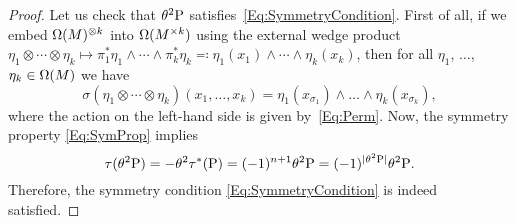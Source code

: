 \documentclass[\MainFolder/Text.tex]{subfiles}
\begin{document}
\begin{proof}
Let us check that $\theta^{2}\mathrm{P}$ satisfies~\eqref{Eq:SymmetryCondition}. First of all, if we embed $\Omega(M)^{\otimes k}$ into $\Omega(M^{\times k})$ using the external wedge product $\eta_1 \otimes \dotsb \otimes \eta_k \mapsto \pi_1^*\eta_1 \wedge \dotsm \wedge \pi_k^* \eta_k \eqqcolon \eta_1(x_1)\wedge \dotsm \wedge \eta_k(x_k)$, then for all $\eta_1$, $\dotsc$, $\eta_k \in \Omega(M)$ we have
\[\sigma(\eta_1 \otimes \dotsb \otimes \eta_k)(x_1,\dotsc,x_k) = \eta_1(x_{\sigma_1})\wedge \dotsc \wedge \eta_k(x_{\sigma_k}), \]
where the action on the left-hand side is given by~\eqref{Eq:Perm}. Now, the symmetry property \eqref{Eq:SymProp} implies
\[ \tau(\theta^{2}\mathrm{P}) = - \theta^{2}\tau^*(\mathrm{P}) = (-1)^{n+1} \theta^{2} \mathrm{P} = (-1)^{|\theta^2 \mathrm{P}|} \theta^2 \mathrm{P}. \]
Therefore, the symmetry condition \eqref{Eq:SymmetryCondition} is indeed satisfied.


\end{proof}
\end{document}
